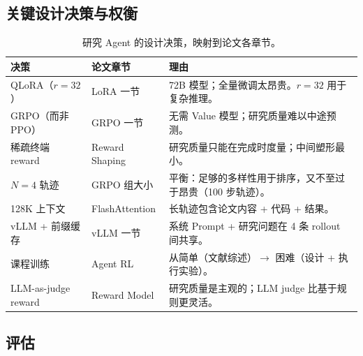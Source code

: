 \subsection{关键设计决策与权衡}
\label{key-design-decisions-and-tradeoffs}

\begin{table}[ht!]
\centering\small
\caption{研究 Agent 的设计决策，映射到论文各章节。}
\noindent\begin{tabularx}{\linewidth}{@{}l Z{0.45} Z{1.55}@{}}
\toprule
\textbf{决策} & \textbf{论文章节} & \textbf{理由} \\
\midrule
QLoRA（$r=32$） & LoRA 一节 & 72B 模型；全量微调太昂贵。$r=32$ 用于复杂推理。 \\
GRPO（而非 PPO） & GRPO 一节 & 无需 Value 模型；研究质量难以中途预测。 \\
稀疏终端 reward & Reward Shaping & 研究质量只能在完成时度量；中间塑形最小。 \\
$N=4$ 轨迹 & GRPO 组大小 & 平衡：足够的多样性用于排序，又不至过于昂贵（100 步轨迹）。 \\
128K 上下文 & FlashAttention & 长轨迹包含论文内容 + 代码 + 结果。 \\
vLLM + 前缀缓存 & vLLM 一节 & 系统 Prompt + 研究问题在 4 条 rollout 间共享。 \\
课程训练 & Agent RL & 从简单（文献综述）$\to$ 困难（设计 + 执行实验）。 \\
LLM-as-judge reward & Reward Model & 研究质量是主观的；LLM judge 比基于规则更灵活。 \\
\bottomrule
\end{tabularx}
\end{table}

\subsection{评估}
\label{evaluation-dup2}


